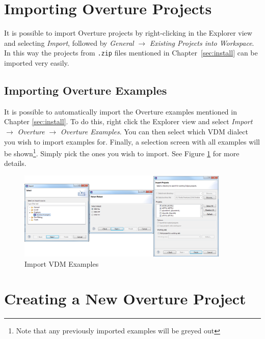 \documentclass{overturerepchap}
\begin{document}
\section{Importing Overture Projects}\label{subsec:importproj}

It is possible to import Overture projects by
right-clicking in the Explorer view and selecting \emph{Import}, followed
by \emph{General} $\rightarrow$ \emph{Existing Projects into
  Workspace}.  In this way the projects from \texttt{.zip} files
mentioned in Chapter~\ref{sec:install} can be imported very
easily.

\subsection{Importing Overture Examples}
\label{ssec:importexamples}

It is possible to automatically import the Overture examples mentioned in
Chapter \ref{sec:install}. To do this, right click the Explorer view and select
\emph{Import} $\rightarrow$ \emph{Overture} $\rightarrow$ \emph{Overture
Examples}.  You can then select which VDM dialect you wish to import examples
for. Finally, a selection screen with all examples will be shown\footnote{Note
that any previously imported examples will be greyed out}. Simply pick the ones
you wish to import. See Figure \ref{fig:example_import} for more
details.


\begin{figure}[!htb]
	\begin{center}
	  \includegraphics[width=0.9\textwidth]{figures/ImportExamples}
	  \caption[Import VDM Examples]{Import VDM Examples}
	  \label{fig:example_import}
	\end{center}
\end{figure}


\section{Creating a New Overture Project}
\end{document}
